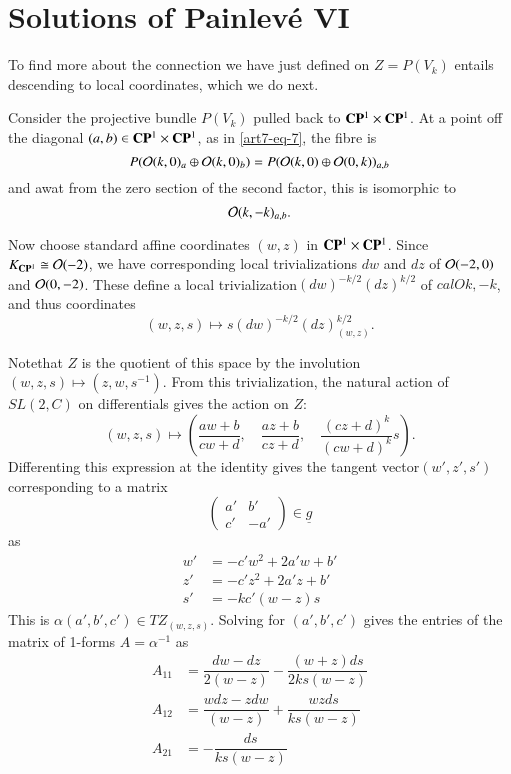 \section{Solutions of Painlev\'e VI}\label{art7-sec-5}

To find more about the connection we have just defined on $Z=P(V_{k})$ entails descending to local coordinates, which we do next.

Consider the projective bundle $P(V_{k})$ pulled back to $\mathbf{C}\mathbf{P}^{1} \times \mathbf{C}\mathbf{P}^{1}$. At a point off the diagonal $(a, b) \in \mathbf{C}\mathbf{P}^{1} \times \mathbf{C}\mathbf{P}^{1}$, as in \eqref{art7-eq-7}, the fibre is
$$
P(\mathcal{O}(k,0)_{a} \oplus \mathcal{O}(k,0)_{b}) = P(\mathcal{O}(k,0) \oplus \mathcal{O}(0,k))_{a,b}
$$
and awat from the zero section of the second factor, this is isomorphic to
$$
\mathcal{O}(k,-k)_{a,b}.
$$

Now choose standard affine coordinates $(w,z)$ in $\mathbf{C}\mathbf{P}^{1} \times \mathbf{C}\mathbf{P}^{1}$. Since $K_{\mathbf{C}\mathbf{P}^{1}} \cong \mathcal{O} (-2)$, we have corresponding local trivializations $dw$ and $dz$ of $\mathcal{O}(-2, 0)$ and $\mathcal{O}(0, -2)$. These define a local trivialization\break $(dw)^{-k/2}(dz)^{k/2}$ of $calO{k, -k}$, and thus coordinates
$$
(w, z, s)\mapsto s(dw)^{-k/2}(dz)_{(w,z)}^{k/2}.
$$

\newpage
\noindent
Note\pageoriginale that $Z$ is the quotient of this space by the involution $(w,z, s) \mapsto (z,w,s^{-1})$. From this trivialization, the natural action of $ SL(2, C)$ on differentials gives the action on $Z$:
$$
(w, z, s) \mapsto \left( \dfrac{aw+b}{cw+d},\quad  \dfrac{az+b}{cz+d},\quad \dfrac{(cz+d)^{k}}{(cw +d)^{k}} s\right).
$$
Differenting this expression at the identity gives the tangent vector\break $(w', z', s')$
corresponding to a matrix
$$
\left(
\begin{matrix}
a' & b'\\
c' & -a'
\end{matrix}
\right)
\in \underline{g}
$$
as
\begin{align*}
w' &= -c'w^{2} +2a'w +b'\\
z'&= -c'z^{2} + 2a'z +b'\\
s' &= -kc'(w-z)s
\end{align*}
This is $\alpha(a',b', c') \in TZ_{(w,z,s)}$. Solving for $(a',b',c')$ gives the entries of the matrix of 1-forms $A=\alpha^{-1}$ as 
\begin{align*}\label{art7-eq-12}
A_{11} &= \dfrac{dw-dz}{2(w-z)} - \dfrac{(w+z)ds}{2ks(w-z)} \nonumber\\
A_{12} &= \dfrac{wdz-zdw}{(w-z)} + \dfrac{wzds}{ks(w-z)}\tag{12}\\
A_{21} &= -\dfrac{ds}{ks(w-z)}\nonumber
\end{align*}

